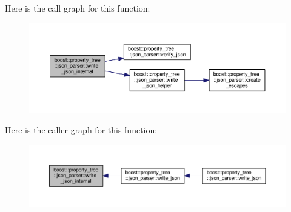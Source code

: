 Here is the call graph for this function\+:
\nopagebreak
\begin{figure}[H]
\begin{center}
\leavevmode
\includegraphics[width=350pt]{namespaceboost_1_1property__tree_1_1json__parser_af1059520397d396ae91e776391a2f32b_cgraph}
\end{center}
\end{figure}




Here is the caller graph for this function\+:
\nopagebreak
\begin{figure}[H]
\begin{center}
\leavevmode
\includegraphics[width=350pt]{namespaceboost_1_1property__tree_1_1json__parser_af1059520397d396ae91e776391a2f32b_icgraph}
\end{center}
\end{figure}


